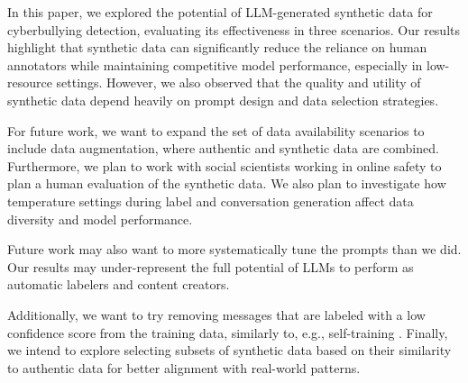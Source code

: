 In this paper, we explored the potential of LLM-generated synthetic data for cyberbullying detection, evaluating its effectiveness in three scenarios. %
Our results highlight that synthetic data can significantly reduce the reliance on human annotators while maintaining competitive model performance, especially in low-resource settings. However, we also observed that the quality and utility of synthetic data depend heavily on prompt design and data selection strategies.

For future work, we want to expand the set of data availability scenarios to include data augmentation, where authentic and synthetic data are combined.
Furthermore, we plan to work with social scientists working in online safety %
to plan a human evaluation of the synthetic data.
%
We also plan to investigate how temperature settings during label and conversation generation affect data diversity and model performance.%

Future work may also want to more systematically tune the prompts than we did.
Our results may under-represent the full potential of LLMs to perform as automatic labelers and content creators.

Additionally, we want to try removing messages that are labeled with a low confidence score from the training data, similarly to, e.g., self-training \cite{yarowsky-1995-unsupervised}. %
Finally, we intend to explore %
selecting subsets of synthetic data based on their similarity to authentic data
for better alignment with real-world patterns.

